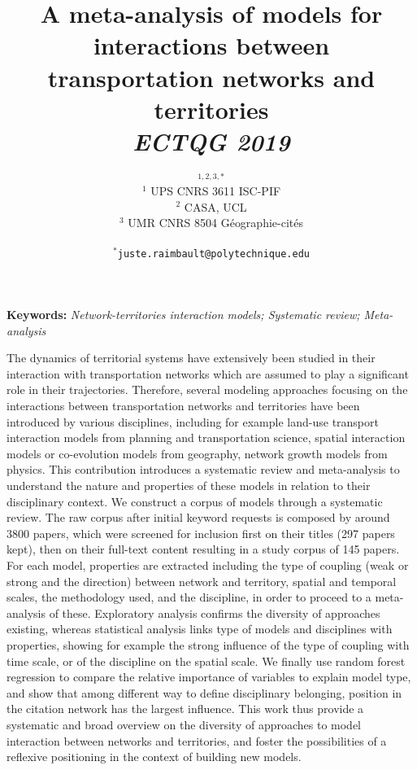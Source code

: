 \documentclass[11pt]{article}
\begin{document}
\title{A meta-analysis of models for interactions between transportation networks and territories
\\\medskip
\textit{ECTQG 2019}
}
\author{$^{1,2,3,\ast}$\medskip\\
$^1$ UPS CNRS 3611 ISC-PIF\\
$^2$ CASA, UCL\\
$^3$ UMR CNRS 8504 G{\'e}ographie-cit{\'e}s\\
\medskip\\
$^{\ast}$\texttt{juste.raimbault@polytechnique.edu}
}
\date{}

\maketitle

\justify



\textbf{Keywords: }\textit{Network-territories interaction models; Systematic review; Meta-analysis}

\medskip


The dynamics of territorial systems have extensively been studied in their interaction with transportation networks which are assumed to play a significant role in their trajectories. Therefore, several modeling approaches focusing on the interactions between transportation networks and territories have been introduced by various disciplines, including for example land-use transport interaction models from planning and transportation science, spatial interaction models or co-evolution models from geography, network growth models from physics. This contribution introduces a systematic review and meta-analysis to understand the nature and properties of these models in relation to their disciplinary context. We construct a corpus of models through a systematic review. The raw corpus after initial keyword requests is composed by around 3800 papers, which were screened for inclusion first on their titles (297 papers kept), then on their full-text content resulting in a study corpus of 145 papers. For each model, properties are extracted including the type of coupling (weak or strong and the direction) between network and territory, spatial and temporal scales, the methodology used, and the discipline, in order to proceed to a meta-analysis of these. Exploratory analysis confirms the diversity of approaches existing, whereas statistical analysis links type of models and disciplines with properties, showing for example the strong influence of the type of coupling with time scale, or of the discipline on the spatial scale. We finally use random forest regression to compare the relative importance of variables to explain model type, and show that among different way to define disciplinary belonging, position in the citation network has the largest influence. This work thus provide a systematic and broad overview on the diversity of approaches to model interaction between networks and territories, and foster the possibilities of a reflexive positioning in the context of building new models.
\end{document}
